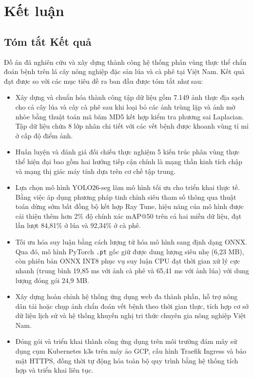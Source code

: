 \section{Kết luận}

\subsection{Tóm tắt Kết quả}
Đồ án đã nghiên cứu và xây dựng thành công hệ thống phân vùng thực thể chẩn đoán bệnh trên lá cây nông nghiệp đặc sản lúa và cà phê tại Việt Nam. Kết quả đạt được so với các mục tiêu đề ra ban đầu được tóm tắt như sau:
\begin{itemize}
  \item Xây dựng và chuẩn hóa thành công tập dữ liệu gồm 7.149 ảnh thực địa sạch cho cả cây lúa và cây cà phê sau khi loại bỏ các ảnh trùng lặp và ảnh mờ nhòe bằng thuật toán mã băm MD5 kết hợp kiểm tra phương sai Laplacian. Tập dữ liệu chứa 8 lớp nhãn chi tiết với các vết bệnh được khoanh vùng tỉ mỉ ở cấp độ điểm ảnh.
  \item Huấn luyện và đánh giá đối chiếu thực nghiệm 5 kiến trúc phân vùng thực thể hiện đại bao gồm hai hướng tiếp cận chính là mạng thần kinh tích chập và mạng thị giác máy tính dựa trên cơ chế tập trung.
  \item Lựa chọn mô hình YOLO26-seg làm mô hình tối ưu cho triển khai thực tế. Bằng việc áp dụng phương pháp tinh chỉnh siêu tham số thông qua thuật toán dừng sớm bất đồng bộ kết hợp Ray Tune, hiệu năng của mô hình được cải thiện thêm hơn 2\% độ chính xác mAP@50 trên cả hai miền dữ liệu, đạt lần lượt 84,81\% ở lúa và 92,34\% ở cà phê.
  \item Tối ưu hóa suy luận bằng cách lượng tử hóa mô hình sang định dạng ONNX. Qua đó, mô hình PyTorch \texttt{.pt} gốc giữ được dung lượng siêu nhẹ (6,23 MB), còn phiên bản ONNX INT8 phục vụ suy luận CPU đạt thời gian xử lý cực nhanh (trung bình 19,85 ms với ảnh cà phê và 65,41 ms với ảnh lúa) với dung lượng đóng gói 24,9 MB.
  \item Xây dựng hoàn chỉnh hệ thống ứng dụng web đa thành phần, hỗ trợ nông dân tải hoặc chụp ảnh chẩn đoán vết bệnh theo thời gian thực, tích hợp cơ sở dữ liệu lịch sử và hệ thống khuyến nghị tri thức chuyên gia nông nghiệp Việt Nam.
  \item Đóng gói và triển khai thành công ứng dụng trên môi trường đám mây sử dụng cụm Kubernetes k3s trên máy ảo GCP, cấu hình Traefik Ingress và bảo mật HTTPS, đồng thời tự động hóa toàn bộ quy trình bằng hệ thống tích hợp và triển khai liên tục.
\end{itemize}

